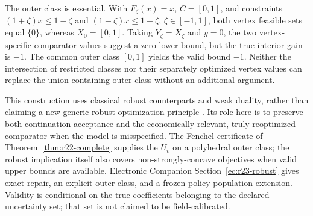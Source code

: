 The outer class is essential. With $F_\zeta(x)=x$, $C=[0,1]$, and constraints $(1+\zeta)x\leq1-\zeta$ and $(1-\zeta)x\leq1+\zeta$, $\zeta\in[-1,1]$, both vertex feasible sets equal $\{0\}$, whereas $X_0=[0,1]$. Taking $Y_\zeta=X_\zeta$ and $y=0$, the two vertex-specific comparator values suggest a zero lower bound, but the true interior gain is $-1$. The common outer class $[0,1]$ yields the valid bound $-1$. Neither the intersection of restricted classes nor their separately optimized vertex values can replace the union-containing outer class without an additional argument.

This construction uses classical robust counterparts and weak duality, rather than claiming a new generic robust-optimization principle \citep{BenTalNemirovski2000,BertsimasSim2004}. Its role here is to preserve both continuation acceptance and the economically relevant, truly reoptimized comparator when the model is misspecified. The Fenchel certificate of Theorem~\ref{thm:r22-complete} supplies the $U_v$ on a polyhedral outer class; the robust implication itself also covers non-strongly-concave objectives when valid upper bounds are available. Electronic Companion Section~\ref{ec:r23-robust} gives exact repair, an explicit outer class, and a frozen-policy population extension. Validity is conditional on the true coefficients belonging to the declared uncertainty set; that set is not claimed to be field-calibrated.
